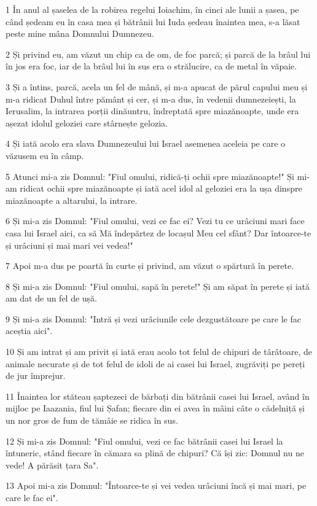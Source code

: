 \par 1 În anul al șaselea de la robirea regelui Ioiachim, în cinci ale lunii a șasea, pe când ședeam eu în casa mea și bătrânii lui Iuda ședeau înaintea mea, s-a lăsat peste mine mâna Domnului Dumnezeu.
\par 2 Și privind eu, am văzut un chip ca de om, de foc parcă; și parcă de la brâul lui în jos era foc, iar de la brâul lui în sus era o strălucire, ca de metal în văpaie.
\par 3 Și a întins, parcă, acela un fel de mână, și m-a apucat de părul capului meu și m-a ridicat Duhul între pământ și cer, și m-a dus, în vedenii dumnezeiești, la Ierusalim, la intrarea porții dinăuntru, îndreptată spre miazănoapte, unde era așezat idolul geloziei care stârnește gelozia.
\par 4 Și iată acolo era slava Dumnezeului lui Israel asemenea aceleia pe care o văzusem eu în câmp.
\par 5 Atunci mi-a zis Domnul: "Fiul omului, ridică-ți ochii spre miazănoapte!" Și mi-am ridicat ochii spre miazănoapte și iată acel idol al geloziei era la ușa dinspre miazănoapte a altarului, la intrare.
\par 6 Și mi-a zis Domnul: "Fiul omului, vezi ce fac ei? Vezi tu ce urâciuni mari face casa lui Israel aici, ca să Mă îndepărtez de locașul Meu cel sfânt? Dar întoarce-te și urâciuni și mai mari vei vedea!"
\par 7 Apoi m-a dus pe poartă în curte și privind, am văzut o spărtură în perete.
\par 8 Și mi-a zis Domnul: "Fiul omului, sapă în perete!" Și am săpat în perete și iată am dat de un fel de ușă.
\par 9 Și mi-a zis Domnul: "Intră și vezi urâciunile cele dezgustătoare pe care le fac aceștia aici".
\par 10 Și am intrat și am privit și iată erau acolo tot felul de chipuri de târâtoare, de animale necurate și de tot felul de idoli de ai casei lui Israel, zugrăviți pe pereți de jur împrejur.
\par 11 Înaintea lor stăteau șaptezeci de bărbați din bătrânii casei lui Israel, având în mijloc pe Iaazania, fiul lui Șafan; fiecare din ei avea în mâini câte o cădelniță și un nor gros de fum de tămâie se ridica în sus.
\par 12 Și mi-a zis Domnul: "Fiul omului, vezi ce fac bătrânii casei lui Israel la întuneric, stând fiecare în cămara sa plină de chipuri? Că își zic: Domnul nu ne vede! A părăsit țara Sa".
\par 13 Apoi mi-a zis Domnul: "Întoarce-te și vei vedea urâciuni încă și mai mari, pe care le fac ei".
